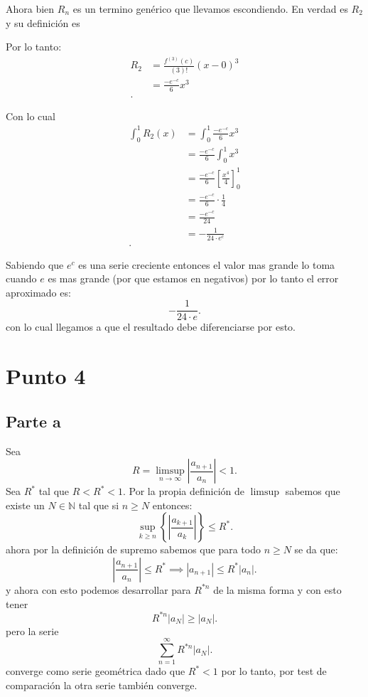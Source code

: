 \documentclass{report}
\begin{document}
Ahora bien $R_n$ es un termino genérico que llevamos escondiendo. En verdad es $R_2$ y su definición es

Por lo tanto:
\begin{align*}
  R_2 &= \frac{f^{(3)}\left( c \right) }{\left( 3 \right)!}\left( x - 0 \right)^{3}\\
  &= \frac{-e^{-c}}{6}x^{3} \\
.\end{align*}

Con lo cual
\begin{align*}
  \int_{0}^{1}R_2\left( x \right) &= \int_{0}^{1} \frac{-e^{-c}}{6}x^{3} \\
  &= \frac{-e^{-c}}{6}\int_{0}^{1} x^{3} \\
  &= \frac{-e^{-c}}{6} \left[ \frac{x^{4}}{4} \right]_{0}^{1} \\
  &= \frac{-e^{-c}}{6}\cdot \frac{1}{4} \\
  &= \frac{-e^{-c}}{24} \\
  &= -\frac{1}{24\cdot e^{c}} \\
.\end{align*}

Sabiendo que $e^{c}$ es una serie creciente entonces el valor mas grande lo toma cuando $e$ es mas grande (por que estamos en negativos) por lo tanto el error aproximado es: \[
- \frac{1}{24\cdot e}
.\] con lo cual llegamos a que el resultado debe diferenciarse por esto.
\section{Punto 4}
\subsection{Parte a}

Sea \[
R = \limsup_{n \to \infty}\left| \frac{a_{n + 1}}{a_n} \right| < 1
.\] Sea $R^{*}$ tal que $R < R^{*} < 1$. Por la propia definición de $\limsup$ sabemos que existe un $N \in \mathbb{N}$ tal que si $n \ge N$ entonces: \[
\sup_{k \ge n}\left\{ \left| \frac{a_{k + 1}}{a_k} \right|  \right\} \le R^{*}
.\] ahora por la definición de supremo sabemos que para todo $n \ge  N$ se da que: \[
\left| \frac{a_{n + 1}}{a_n} \right| \le R^{*} \implies \left| a_{n + 1} \right| \le R^{*}\left| a_n \right| 
.\] y ahora con esto podemos desarrollar para $R^{*n}$ de la misma forma y con esto tener  \[
R^{*n}\left| a_N \right| \ge \left| a_{N} \right| 
.\] pero la serie \[
\sum_{n=1}^{\infty} R^{*n}\left| a_N \right| 
.\] converge como serie geométrica dado que $R^{*} < 1$ por lo tanto, por test de comparación la otra serie también converge.
\end{document}
